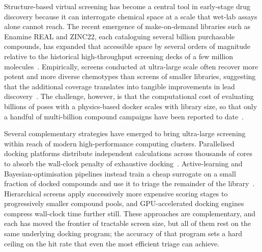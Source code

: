 \documentclass[11pt]{article}
\begin{document}
Structure-based virtual screening has become a central tool in early-stage
drug discovery because it can interrogate chemical space at a scale that
wet-lab assays alone cannot reach. The recent emergence of make-on-demand
libraries such as Enamine REAL and ZINC22, each cataloguing several billion
purchasable compounds, has expanded that accessible space by several
orders of magnitude relative to the historical high-throughput screening
decks of a few million molecules~\citep{lyu2019ultralarge,tingle2023zinc22,
irwin2005zinc}. Empirically, screens conducted at ultra-large scale often
recover more potent and more diverse chemotypes than screens of smaller
libraries, suggesting that the additional coverage translates into tangible
improvements in lead discovery~\citep{lyu2019ultralarge,gorgulla2020virtualflow}.
The challenge, however, is that the computational cost of evaluating
billions of poses with a physics-based docker scales with library size, so
that only a handful of multi-billion compound campaigns have been reported
to date~\citep{gorgulla2020virtualflow,gentile2022deepdocking}.

Several complementary strategies have emerged to bring ultra-large
screening within reach of modern high-performance computing clusters.
Parallelised docking platforms distribute independent calculations across
thousands of cores to absorb the wall-clock penalty of exhaustive
docking~\citep{gorgulla2020virtualflow,yaacoub2022ddgui}. Active-learning
and Bayesian-optimisation pipelines instead train a cheap surrogate on a
small fraction of docked compounds and use it to triage the remainder of
the library~\citep{graff2021accelerating,gentile2022deepdocking}.
Hierarchical screens apply successively more expensive scoring stages to
progressively smaller compound pools, and GPU-accelerated docking
engines compress wall-clock time further still. These approaches are
complementary, and each has moved the frontier of tractable screen size,
but all of them rest on the same underlying docking program; the accuracy
of that program sets a hard ceiling on the hit rate that even the most
efficient triage can achieve.
\end{document}

